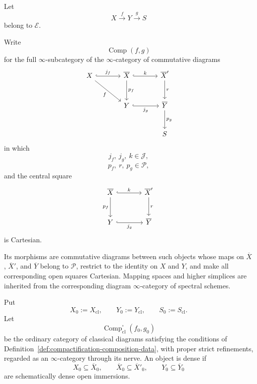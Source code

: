 \begin{definition}
\label{def:compactification-composition-data}
Let
\[
    X\xrightarrow{f}Y\xrightarrow{g}S
\]
belong to \(\mathcal E\).

Write
\[
    \operatorname{Comp}(f,g)
\]
for the full \(\infty\)-subcategory of the \(\infty\)-category of
commutative diagrams
\[
\begin{tikzcd}[column sep=large,row sep=large]
    X \arrow[r,hook,"j_f"] \arrow[dr,"f"']
        & \overline X \arrow[d,"p_f"] \arrow[r,hook,"k"]
        & \overline X' \arrow[d,"r"] \\
    & Y \arrow[r,hook,"j_g"']
        & \overline Y \arrow[d,"p_g"] \\
    && S
\end{tikzcd}
\]
in which
\[
    j_f,
    \ j_g,
    \ k
    \in
    \mathcal J,
\]
\[
    p_f,
    \ r,
    \ p_g
    \in
    \mathcal P,
\]
and the central square
\[
\begin{tikzcd}[column sep=large,row sep=large]
    \overline X \arrow[r,hook,"k"] \arrow[d,"p_f"']
        & \overline X' \arrow[d,"r"] \\
    Y \arrow[r,hook,"j_g"']
        & \overline Y
\end{tikzcd}
\]
is Cartesian.

Its morphisms are commutative diagrams between such objects whose maps on
\(\overline X\), \(\overline X'\), and \(\overline Y\) belong to
\(\mathcal P\), restrict to the identity on \(X\) and \(Y\), and make all
corresponding open squares Cartesian.  Mapping spaces and higher simplices
are inherited from the corresponding diagram \(\infty\)-category of
spectral schemes.
\end{definition}

\begin{definition}
\label{def:strict-classical-composition-data}
Put
\[
    X_0:=X_{\mathrm{cl}},
    \qquad
    Y_0:=Y_{\mathrm{cl}},
    \qquad
    S_0:=S_{\mathrm{cl}}.
\]
Let
\[
    \operatorname{Comp}^{\square}_{\mathrm{cl}}(f_0,g_0)
\]
be the ordinary category of classical diagrams satisfying the conditions of
Definition~\ref{def:compactification-composition-data}, with proper strict
refinements, regarded as an \(\infty\)-category through its nerve.
An object is dense if
\[
    X_0\subseteq\overline X_0,
    \qquad
    \overline X_0\subseteq\overline X'_0,
    \qquad
    Y_0\subseteq\overline Y_0
\]
are schematically dense open immersions.
\end{definition}

